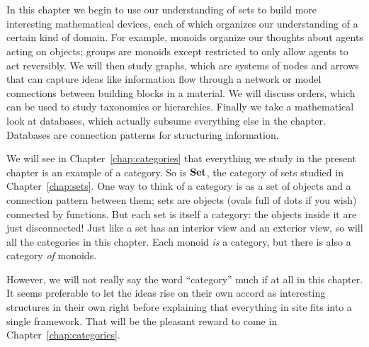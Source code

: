 \documentclass[CT4S-EN-RU]{subfiles}
\begin{document}
\chapter{}\label{chap:categories and functors without admitting it}

\begin{blockENG}
In this chapter we begin to use our understanding of sets to build more interesting mathematical devices, each of which organizes our understanding of a certain kind of domain. For example, monoids organize our thoughts about agents acting on objects; groups are monoids except restricted to only allow agents to act reversibly. We will then study graphs, which are systems of nodes and arrows that can capture ideas like information flow through a network or model connections between building blocks in a material. We will discuss orders, which can be used to study taxonomies or hierarchies. Finally we take a mathematical look at databases, which actually subsume everything else in the chapter. Databases are connection patterns for structuring information.
\end{blockENG}

\begin{blockRUS}
\end{blockRUS}

\begin{blockENG}
We will see in Chapter~\ref{chap:categories} that everything we study in the present chapter is an example of a category. So is ${\mathbf{Set}}$, the category of sets studied in Chapter~\ref{chap:sets}. One way to think of a category is as a set of objects and a connection pattern between them; sets are objects (ovals full of dots if you wish) connected by functions. But each set is itself a category: the objects inside it are just disconnected! Just like a set has an interior view and an exterior view, so will all the categories in this chapter. Each monoid {\em is} a category, but there is also a category {\em of} monoids. 
\end{blockENG}

\begin{blockRUS}
\end{blockRUS}

\begin{blockENG}
However, we will not really say the word “category” much if at all in this chapter. It seems preferable to let the ideas rise on their own accord as interesting structures in their own right before explaining that everything in site fits into a single framework. That will be the pleasant reward to come in Chapter~\ref{chap:categories}.
\end{blockENG}
\end{document}

